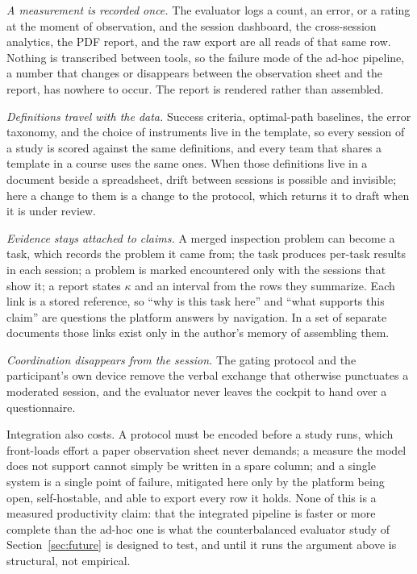 \documentclass[conference]{IEEEtran}
\begin{document}
\emph{A measurement is recorded once.} The evaluator logs a count, an error,
or a rating at the moment of observation, and the session dashboard, the
cross-session analytics, the PDF report, and the raw export are all reads of
that same row. Nothing is transcribed between tools, so the failure mode of the
ad-hoc pipeline, a number that changes or disappears between the observation
sheet and the report, has nowhere to occur. The report is rendered rather than
assembled.

\emph{Definitions travel with the data.} Success criteria, optimal-path
baselines, the error taxonomy, and the choice of instruments live in the
template, so every session of a study is scored against the same definitions,
and every team that shares a template in a course uses the same ones. When
those definitions live in a document beside a spreadsheet, drift between
sessions is possible and invisible; here a change to them is a change to the
protocol, which returns it to draft when it is under review.

\emph{Evidence stays attached to claims.} A merged inspection problem can
become a task, which records the problem it came from; the task produces
per-task results in each session; a problem is marked encountered only with the
sessions that show it; a report states $\kappa$ and an interval from the rows
they summarize. Each link is a stored reference, so ``why is this task here''
and ``what supports this claim'' are questions the platform answers by
navigation. In a set of separate documents those links exist only in the
author's memory of assembling them.

\emph{Coordination disappears from the session.} The gating protocol and the
participant's own device remove the verbal exchange that otherwise punctuates
a moderated session, and the evaluator never leaves the cockpit to hand over a
questionnaire.

Integration also costs. A protocol must be encoded before a study runs, which
front-loads effort a paper observation sheet never demands; a measure the
model does not support cannot simply be written in a spare column; and a single
system is a single point of failure, mitigated here only by the platform being
open, self-hostable, and able to export every row it holds. None of this is a
measured productivity claim: that the integrated pipeline is faster or more
complete than the ad-hoc one is what the counterbalanced evaluator study of
Section~\ref{sec:future} is designed to test, and until it runs the argument
above is structural, not empirical.
\end{document}
